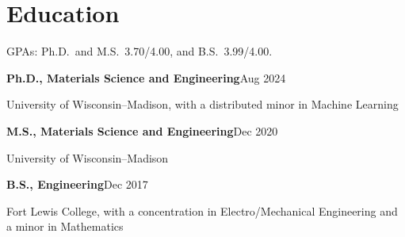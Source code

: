 \section{Education}

\small{GPAs: Ph.D.\ and M.S.\ 3.70/4.00, and B.S.\ 3.99/4.00.}\par
\vspace{0.2em}
\textbf{Ph.D., Materials Science and Engineering}\hfill Aug 2024\par
University of Wisconsin--Madison, with a distributed minor in Machine Learning\par
\vspace{0.2em}
\textbf{M.S., Materials Science and Engineering}\hfill Dec 2020\par
University of Wisconsin--Madison\par
\vspace{0.2em}
\textbf{B.S., Engineering}\hfill Dec 2017\par
Fort Lewis College, with a concentration in Electro/Mechanical Engineering and a minor in Mathematics\par
\vspace{0.2em}
